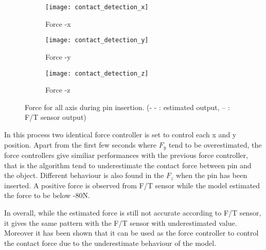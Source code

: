 \begin{figure}[h]
  \begin{subfigure}[t]{0.5\textwidth}
    \centering
    \texttt{[image: contact\_detection\_x]} 
    \caption{Force -x}
  \end{subfigure}
  \begin{subfigure}[t]{0.5\textwidth}
    \centering
    \texttt{[image: contact\_detection\_y]}
    \caption{Force -y}
  \end{subfigure}
  \begin{subfigure}[t]{0.5\textwidth}
    \centering
    \texttt{[image: contact\_detection\_z]}
    \caption{Force -z}
  \end{subfigure}  
  \caption{Force for all axis during pin insertion. (- - : estimated output, -- : F/T sensor output)}
  \label{fig:force control pin}
\end{figure}

In this process two identical force controller is set to control each x and y position. Apart from the first few seconds where $F_y$ tend to be overestimated, the force controllers give similiar performances with the previous force controller, that is the algorithm tend to underestimate the contact force between pin and the object. Different behaviour is also found in the $F_z$ when the pin has been inserted. A positive force is observed from F/T sensor while the model estimated the force to be below -80N. 


In overall, while the estimated force is still not accurate according to F/T sensor, it gives the same pattern with the F/T sensor with underestimated value. Moreover it has been shown that it can be used as the force controller to control the contact force due to the underestimate behaviour of the model. 

